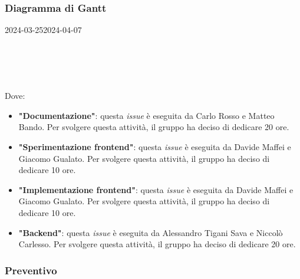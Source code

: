 \subsubsection{Diagramma di Gantt}

\begin{ganttchart}[
		x unit=0.6cm, %
		y unit chart=0.6cm,
		bar/.style={fill=blue!50},
		bar height=0.5,
		time slot format=isodate,
		time slot unit=day,
		vgrid,
		today=2024-03-26,
		today rule/.style={draw=red, ultra thick}
	]{2024-03-25}{2024-04-07}
	 \\
	 \\
	 \\
	 \\
	 \\
\end{ganttchart}

Dove:
\begin{itemize}
	\item \textbf{"Documentazione"}: questa \textit{issue} è eseguita da
	      Carlo Rosso e Matteo Bando. Per svolgere questa attività, il gruppo ha deciso di
	      dedicare 20 ore.

	\item \textbf{"Sperimentazione frontend"}: questa \textit{issue} è eseguita
	      da Davide Maffei e Giacomo Gualato. Per svolgere questa attività, il
	      gruppo ha deciso di dedicare 10 ore.

	\item \textbf{"Implementazione frontend"}: questa \textit{issue} è eseguita
	      da Davide Maffei e Giacomo Gualato. Per svolgere questa attività, il
	      gruppo ha deciso di dedicare 10 ore.

	\item \textbf{"Backend"}: questa \textit{issue} è eseguita da Alessandro
	      Tigani Sava e Niccolò Carlesso. Per svolgere questa attività, il
	      gruppo ha deciso di dedicare 20 ore.
\end{itemize}

\subsubsection{Preventivo}

